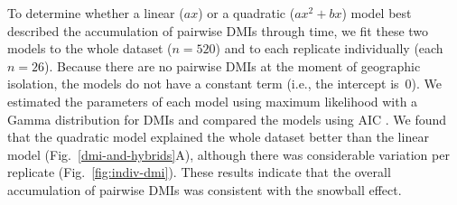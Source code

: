 \begin{doublespace}
To determine whether a linear ($ax$) or a quadratic ($ax^{2} + bx$) model
best described the accumulation of pairwise DMIs through time,
we fit these two models to the whole dataset ($n = 520$)
and to each replicate individually (each $n = 26$).
%
Because there are no pairwise DMIs at the moment of geographic isolation,
the models do not have a constant term (i.e., the intercept is~0).
%
We estimated the parameters of each model using maximum likelihood
with a Gamma distribution for DMIs and compared the models using AIC
\citep{bol08}.
%
We found that the quadratic model explained the whole dataset better
than the linear model (Fig.~\ref{dmi-and-hybrids}A),
although there was considerable variation per replicate
(Fig.~\ref{fig:indiv-dmi}).
%
These results indicate that the overall accumulation of pairwise DMIs
was consistent with the snowball effect.




\end{doublespace}
